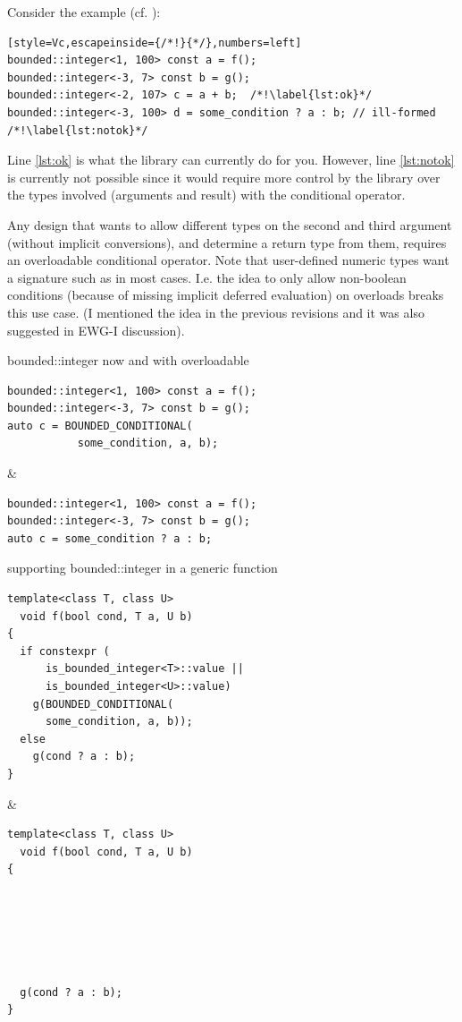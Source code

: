 Consider the  example (cf. \cite{site.bounded-integer}):
\smallskip\begin{lstlisting}[style=Vc,escapeinside={/*!}{*/},numbers=left]
bounded::integer<1, 100> const a = f();
bounded::integer<-3, 7> const b = g();
bounded::integer<-2, 107> c = a + b;  /*!\label{lst:ok}*/
bounded::integer<-3, 100> d = some_condition ? a : b; // ill-formed /*!\label{lst:notok}*/
\end{lstlisting}

Line \ref{lst:ok} is what the  library can currently do for you.
However, line \ref{lst:notok} is currently not possible since it would require more control by the library over the types involved (arguments and result) with the conditional operator.

Any design that wants to allow different types on the second and third argument (without implicit conversions), and determine a return type from them, requires an overloadable conditional operator.
Note that user-defined numeric types want a signature such as  in most cases.
I.e. the idea to only allow non-boolean conditions (because of missing implicit deferred evaluation) on  overloads breaks this use case.
(I mentioned the idea in the previous revisions and it was also suggested in EWG-I discussion).

\begin{tonytable}
{bounded::integer now and with overloadable }
\begin{lstlisting}[style=Vc]
bounded::integer<1, 100> const a = f();
bounded::integer<-3, 7> const b = g();
auto c = BOUNDED_CONDITIONAL(
           some_condition, a, b);
\end{lstlisting}
&
\begin{lstlisting}[style=Vc]
bounded::integer<1, 100> const a = f();
bounded::integer<-3, 7> const b = g();
auto c = some_condition ? a : b;
\end{lstlisting}
\end{tonytable}

\begin{tonytable}
{supporting bounded::integer in a generic function}
\begin{lstlisting}[style=Vc]
template<class T, class U>
  void f(bool cond, T a, U b)
{
  if constexpr (
      is_bounded_integer<T>::value ||
      is_bounded_integer<U>::value)
    g(BOUNDED_CONDITIONAL(
      some_condition, a, b));
  else
    g(cond ? a : b);
}
\end{lstlisting}
&
\begin{lstlisting}[style=Vc]
template<class T, class U>
  void f(bool cond, T a, U b)
{






  g(cond ? a : b);
}
\end{lstlisting}
\end{tonytable}

